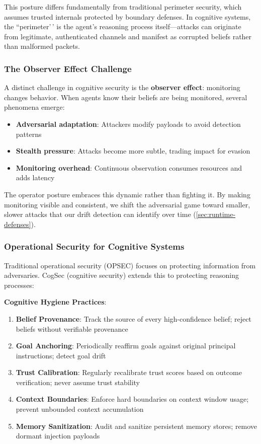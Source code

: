 \documentclass[
]{article}
\begin{document}
This posture differs fundamentally from traditional perimeter security,
which assumes trusted internals protected by boundary defenses. In
cognitive systems, the ``perimeter'\,' is the agent's reasoning process
itself---attacks can originate from legitimate, authenticated channels
and manifest as corrupted beliefs rather than malformed packets.

\subsubsection{The Observer Effect
Challenge}\label{the-observer-effect-challenge}

A distinct challenge in cognitive security is the
\textbf{observer effect}: monitoring changes behavior. When agents know
their beliefs are being monitored, several phenomena emerge:

\begin{itemize}
\item \textbf{Adversarial adaptation}: Attackers modify payloads to avoid detection patterns
\item \textbf{Stealth pressure}: Attacks become more subtle, trading impact for evasion
\item \textbf{Monitoring overhead}: Continuous observation consumes resources and adds latency
\end{itemize}

The operator posture embraces this dynamic rather than fighting it. By
making monitoring visible and consistent, we shift the adversarial game
toward smaller, slower attacks that our drift detection can identify
over time (\cref{sec:runtime-defenses}).

\subsubsection{Operational Security for Cognitive
Systems}\label{operational-security-for-cognitive-systems}

Traditional operational security (OPSEC) focuses on protecting
information from adversaries. CogSec (cognitive security) extends this
to protecting reasoning processes:

\textbf{Cognitive Hygiene Practices}:

\begin{enumerate}
\item \textbf{Belief Provenance}: Track the source of every high-confidence belief; reject beliefs without verifiable provenance
\item \textbf{Goal Anchoring}: Periodically reaffirm goals against original principal instructions; detect goal drift
\item \textbf{Trust Calibration}: Regularly recalibrate trust scores based on outcome verification; never assume trust stability
\item \textbf{Context Boundaries}: Enforce hard boundaries on context window usage; prevent unbounded context accumulation
\item \textbf{Memory Sanitization}: Audit and sanitize persistent memory stores; remove dormant injection payloads
\end{enumerate}
\end{document}
